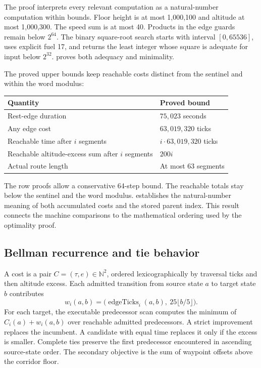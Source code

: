 \documentclass[11pt]{article}
\newcommand{\N}{\mathbb N}
\begin{document}
The proof interprets every relevant  computation as a natural-number computation within bounds.  Floor height is at most 1,000,100 and altitude at most 1,000,300.  The speed sum is at most 40.  Products in the edge guards remain below $2^{64}$.  The binary square-root search starts with interval $[0,65536]$, uses explicit fuel 17, and returns the least integer whose square is adequate for input below $2^{32}$.   proves both adequacy and minimality.

The proved upper bounds keep reachable costs distinct from the sentinel and within the word modulus:
\begin{center}
\begin{tabular}{ll}
\toprule
Quantity & Proved bound\\
\midrule
Rest-edge duration & $75{,}023$ seconds\\
Any edge cost & $63{,}019{,}320$ ticks\\
Reachable time after $i$ segments & $i\cdot63{,}019{,}320$ ticks\\
Reachable altitude-excess sum after $i$ segments & $200i$\\
Actual route length & At most 63 segments\\
\bottomrule
\end{tabular}
\end{center}
The row proofs allow a conservative 64-step bound.  The reachable totals stay below the sentinel and the word modulus.   establishes the natural-number meaning of both accumulated costs and the stored parent index.  This result connects the machine comparisons to the mathematical ordering used by the optimality proof.

\subsection{Bellman recurrence and tie behavior}

A cost is a pair $C=(\tau,e)\in\N^2$, ordered lexicographically by traversal ticks and then altitude excess.  Each admitted transition from source state $a$ to target state $b$ contributes
\[
 w_i(a,b)=\bigl(\operatorname{edgeTicks}_i(a,b),\ 25\lfloor b/5\rfloor\bigr).
\]
For each target, the executable predecessor scan computes the minimum of $C_i(a)+w_i(a,b)$ over reachable admitted predecessors.  A strict improvement replaces the incumbent.  A candidate with equal time replaces it only if the excess is smaller.  Complete ties preserve the first predecessor encountered in ascending source-state order.  The secondary objective is the sum of waypoint offsets above the corridor floor.
\end{document}
